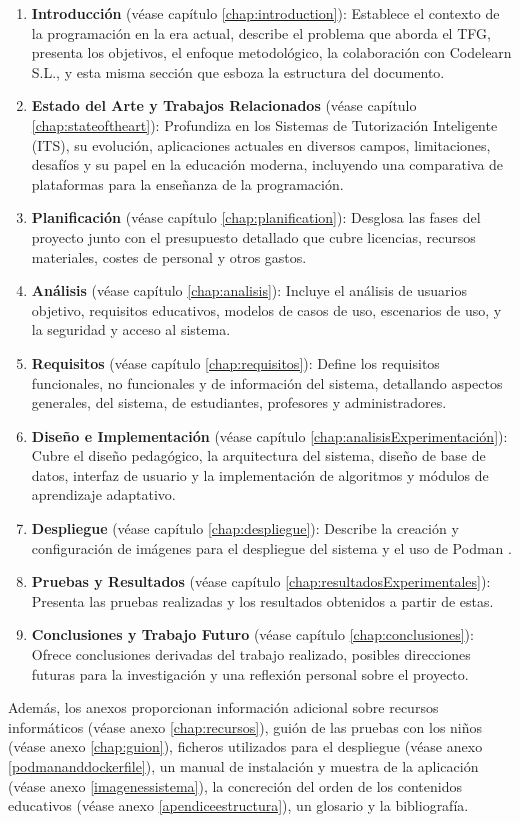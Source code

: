 \begin{enumerate}
    \item  \textbf{Introducción} (véase capítulo \ref{chap:introduction}): Establece el contexto de la programación en la era actual, describe el problema que aborda el TFG, presenta los objetivos, el enfoque metodológico, la colaboración con Codelearn S.L., y esta misma sección que esboza la estructura del documento.
    \item  \textbf{Estado del Arte y Trabajos Relacionados} (véase capítulo \ref{chap:stateoftheart}): Profundiza en los Sistemas de Tutorización Inteligente (ITS), su evolución, aplicaciones actuales en diversos campos, limitaciones, desafíos y su papel en la educación moderna, incluyendo una comparativa de plataformas para la enseñanza de la programación.
    \item \textbf{Planificación} (véase capítulo \ref{chap:planification}): Desglosa las fases del proyecto junto con el presupuesto detallado que cubre licencias, recursos materiales, costes de personal y otros gastos.
    \item \textbf{Análisis} (véase capítulo \ref{chap:analisis}): Incluye el análisis de usuarios objetivo, requisitos educativos, modelos de casos de uso, escenarios de uso, y la seguridad y acceso al sistema.
    \item \textbf{Requisitos} (véase capítulo \ref{chap:requisitos}): Define los requisitos funcionales, no funcionales y de información del sistema, detallando aspectos generales, del sistema, de estudiantes, profesores y administradores.
    \item \textbf{Diseño e Implementación} (véase capítulo \ref{chap:analisisExperimentación}): Cubre el diseño pedagógico, la arquitectura del sistema, diseño de base de datos, interfaz de usuario y la implementación de algoritmos y módulos de aprendizaje adaptativo.
    \item  \textbf{Despliegue} (véase capítulo \ref{chap:despliegue}): Describe la creación y configuración de imágenes para el despliegue del sistema y el uso de Podman \cite{podman}.
    \item \textbf{Pruebas y Resultados} (véase capítulo \ref{chap:resultadosExperimentales}): Presenta las pruebas realizadas y los resultados obtenidos a partir de estas.
    \item \textbf{Conclusiones y Trabajo Futuro} (véase capítulo \ref{chap:conclusiones}): Ofrece conclusiones derivadas del trabajo realizado, posibles direcciones futuras para la investigación y una reflexión personal sobre el proyecto.
\end{enumerate}    

Además, los anexos proporcionan información adicional sobre recursos informáticos (véase anexo \ref{chap:recursos}), guión de las pruebas con los niños (véase anexo \ref{chap:guion}), ficheros utilizados para el despliegue (véase anexo \ref{podmananddockerfile}), un manual de instalación y muestra de la aplicación (véase anexo \ref{imagenessistema}), la concreción del orden de los contenidos educativos (véase anexo \ref{apendiceestructura}), un glosario y la bibliografía.